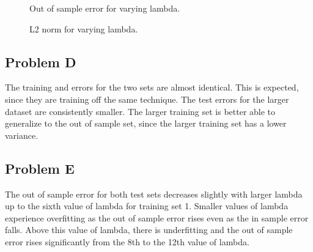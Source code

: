 \documentclass[12pt]{article} %
\begin{document}
\begin{figure}[H]
	\vspace{-10mm}
	\caption{Out of sample error for varying lambda.}
\end{figure}

\begin{figure}[H]
	\vspace{-10mm}
	\caption{L2 norm for varying lambda.}
\end{figure}

\subsection{Problem D}
The training and errors for the two sets are almost identical. This is expected, since they are training off the same technique. The test errors for the larger dataset are consistently smaller. The larger training set is better able to generalize to the out of sample set, since the larger training set has a lower variance.

\subsection{Problem E}
The out of sample error for both test sets decreases slightly with larger lambda up to the sixth value of lambda for training set 1. Smaller values of lambda experience overfitting as the out of sample error rises even as the in sample error falls. Above this value of lambda, there is underfitting and the out of sample error rises significantly from the 8th to the 12th value of lambda.
\end{document}

